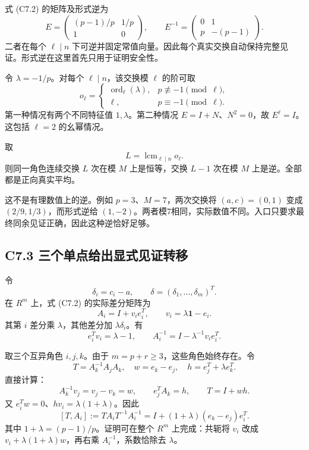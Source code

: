 \documentclass[11pt,a4paper]{article}
\theoremstyle{definition}
\numberwithin{equation}{section}
\begin{document}
{式} {(C7.2)} {的矩阵及形式逆为} \[
E=\begin{pmatrix}(p-1)/p&1/p\\1&0\end{pmatrix},
\qquad E^{-1}=\begin{pmatrix}0&1\\p&-(p-1)\end{pmatrix}.
\] {二者在每个} \(\ell\mid n\) {下可逆并固定常值向量。因此每个真实交换自动保持完整见证。形式逆在这里首先只用于证明安全性。}

{令} \(\lambda=-1/p\){。对每个} \(\ell\mid n\){，该交换模} \(\ell\) {的阶可取} \[
o_\ell=
\begin{cases}
\operatorname{ord}_\ell(\lambda),&p\not\equiv-1\pmod\ell,\\
\ell,&p\equiv-1\pmod\ell.
\end{cases}
\] {第一种情况有两个不同特征值} \(1,\lambda\){。第二种情况} \(E=I+N\){、}\(N^2=0\){，故} \(E^\ell=I\){。这包括} \(\ell=2\) {的幺幂情况。}

{取} \[
L=\operatorname{lcm}_{\ell\mid n}o_\ell.
\] {则同一角色连续交换} \(L\) {次在模} \(M\) {上是恒等，交换} \(L-1\) {次在模} \(M\) {上是逆。全部都是正向真实平均。}

{这不是有理数值上的逆。例如} \(p=3\){、}\(M=7\){，两次交换将} \((a,c)=(0,1)\) {变成} \((2/9,1/3)\){，而形式逆给} \((1,-2)\){。两者模7相同，实际数值不同。入口只要求最终同余见证正确，因此这种逆恰好足够。}

\subsection*{\texorpdfstring{{C7.3} {三个单点给出显式见证转移}}{C7.3 三个单点给出显式见证转移}}\label{C7-h41}

{令} \[
\delta_i=c_i-a,\qquad \delta=(\delta_1,\ldots,\delta_m)^T.
\] {在} \(R^m\) {上，式} {(C7.2)} {的实际差分矩阵为} \[
A_i=I+v_i e_i^T,\qquad v_i=\lambda\mathbf1-e_i.
\tag{C7.3}
\] {其第} \(i\) {差分乘} \(\lambda\){，其他差分加} \(\lambda\delta_i\){。有} \[
e_i^Tv_i=\lambda-1,\qquad
A_i^{-1}=I-\lambda^{-1}v_ie_i^T.
\]

{取三个互异角色} \(i,j,k\){。由于} \(m=p+r\ge3\){，这些角色始终存在。令} \[
T=A_k^{-1}A_jA_k,\quad w=e_k-e_j,\quad h=e_j^T+\lambda e_k^T.
\] {直接计算：} \[
A_k^{-1}v_j=v_j-v_k=w,\qquad e_j^TA_k=h,\qquad T=I+wh.
\] {又} \(e_i^Tw=0\){、}\(hv_i=\lambda(1+\lambda)\){。因此} \[
\boxed{[T,A_i]:=TA_iT^{-1}A_i^{-1}
=I+(1+\lambda)(e_k-e_j)e_i^T.}\tag{C7.4}
\] {其中} \(1+\lambda=(p-1)/p\){。证明可在整个} \(R^m\) {上完成：共轭将} \(v_i\) {改成} \(v_i+\lambda(1+\lambda)w\){，再右乘} \(A_i^{-1}\){，系数恰除去} \(\lambda\){。}
\end{document}
